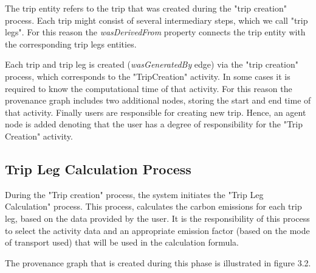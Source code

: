 The trip entity refers to the trip that was created during the "trip creation" process.  Each trip might consist of several intermediary steps, which we call "trip legs". For this reason the \emph{wasDerivedFrom} property connects the trip entity with the corresponding trip legs entities.

Each trip and trip leg is created (\emph{wasGeneratedBy} edge) via the "trip creation" process, which corresponds to the "TripCreation" activity. In some cases it is required to know the computational time of that activity. For this reason the provenance graph includes two additional nodes, storing the start and end time of that activity. Finally users are responsible for creating new trip. Hence, an agent node is added denoting that the user has a degree of responsibility for the "Trip Creation" activity.

\subsection{Trip Leg Calculation Process}

During the "Trip creation" process, the system initiates the "Trip Leg Calculation" process. This process, calculates the carbon emissions for each trip leg, based on the data provided by the user. It is the responsibility of this process to select the activity data and an appropriate emission factor (based on the mode of transport used) that will be used in the calculation formula.

The provenance graph that is created during this phase is illustrated in figure 3.2.


